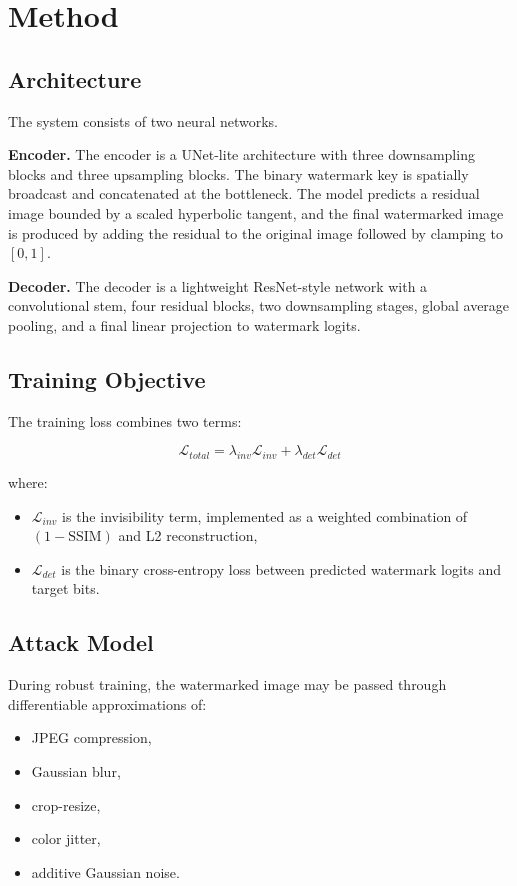 \documentclass[11pt]{article}
\begin{document}
\section{Method}
\subsection{Architecture}
The system consists of two neural networks.

\textbf{Encoder.} The encoder is a UNet-lite architecture with three downsampling blocks and three upsampling blocks. The binary watermark key is spatially broadcast and concatenated at the bottleneck. The model predicts a residual image bounded by a scaled hyperbolic tangent, and the final watermarked image is produced by adding the residual to the original image followed by clamping to $[0,1]$.

\textbf{Decoder.} The decoder is a lightweight ResNet-style network with a convolutional stem, four residual blocks, two downsampling stages, global average pooling, and a final linear projection to watermark logits.

\subsection{Training Objective}
The training loss combines two terms:

\begin{equation}
\mathcal{L}_{total} = \lambda_{inv} \mathcal{L}_{inv} + \lambda_{det} \mathcal{L}_{det}
\end{equation}

where:

\begin{itemize}[leftmargin=1.5em]
  \item $\mathcal{L}_{inv}$ is the invisibility term, implemented as a weighted combination of $(1 - \mathrm{SSIM})$ and L2 reconstruction,
  \item $\mathcal{L}_{det}$ is the binary cross-entropy loss between predicted watermark logits and target bits.
\end{itemize}

\subsection{Attack Model}
During robust training, the watermarked image may be passed through differentiable approximations of:

\begin{itemize}[leftmargin=1.5em]
  \item JPEG compression,
  \item Gaussian blur,
  \item crop-resize,
  \item color jitter,
  \item additive Gaussian noise.
\end{itemize}
\end{document}
